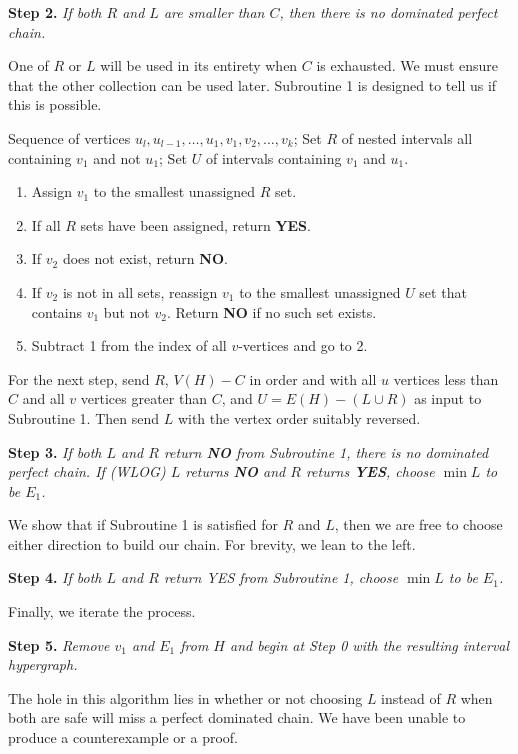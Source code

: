 \begin{framed}{\bf Step 2.} {\it If both $R$ and $L$ are smaller than $C$, then there is no dominated perfect chain.}
\end{framed}

One of $R$ or $L$ will be used in its entirety when $C$ is exhausted.  
%
We must ensure that the other collection can be used later.
%  
Subroutine 1 is designed to tell us if this is possible.
%
\begin{framed}

 Sequence of vertices $u_l, u_{l-1},\ldots,u_1,v_1,v_2,\ldots,v_k$; Set $R$ of nested intervals all containing $v_1$ and not $u_1$; Set $U$ of intervals containing $v_1$ and $u_1$. 

\begin{enumerate}
	\item Assign $v_1$ to the smallest unassigned $R$ set.
	\item If all $R$ sets have been assigned, return {\bf YES}. 
	\item  If $v_2$ does not exist, return {\bf NO}.
	\item If $v_2$ is not in all sets, reassign $v_1$ to the smallest unassigned $U$ set that contains $v_1$ but not $v_2$.  Return {\bf NO} if no such set exists.
	\item Subtract 1 from the index of all $v$-vertices and go to 2.
\end{enumerate}
\end{framed}

For the next step, send $R$, $V(H)-C$ in order and with all $u$ vertices less than $C$ and all $v$ vertices greater than $C$, and $U = E(H) - (L\cup R)$ as input to Subroutine 1.   Then send $L$ with the vertex order suitably reversed.
%

\begin{framed}{\bf Step 3.} {\it If both $L$ and $R$ return {\bf NO} from Subroutine 1, there is no dominated perfect chain.  If (WLOG) $L$ returns {\bf NO} and $R$ returns {\bf YES}, choose $\min L$ to be $E_1$.}  
\end{framed}

We show that if Subroutine 1 is satisfied for $R$ and $L$, then we are free to choose either direction to build our chain.  For brevity, we lean to the left.

\begin{framed}{\bf Step 4.} {\it If both $L$ and $R$ return {\it YES} from Subroutine 1, choose $\min L$ to be $E_1$.}
\end{framed}

Finally, we iterate the process.

\begin{framed}{\bf Step 5.} {\it Remove $v_1$ and $E_1$ from $H$ and begin at Step 0 with the resulting interval hypergraph.}
\end{framed}

The hole in this algorithm lies in whether or not choosing $L$ instead of $R$ when both are safe will miss a perfect dominated chain.  We have been unable to produce a counterexample or a proof.   